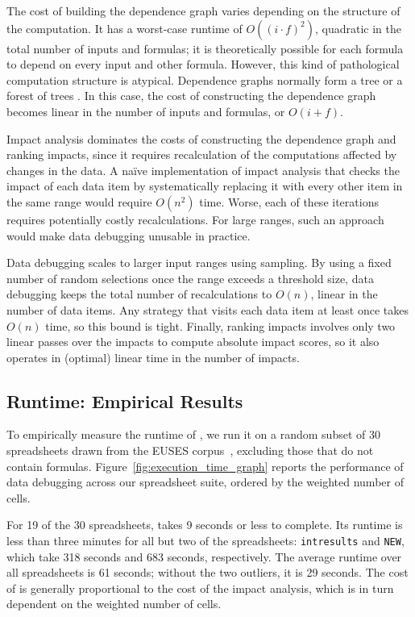 The cost of building the dependence graph varies depending on the
structure of the computation. It has a worst-case runtime of
$O((i\cdot f)^2)$, quadratic in the total number of inputs and formulas; it
is theoretically possible for each formula to depend on every input
and other formula. However, this kind of pathological computation
structure is atypical. Dependence graphs normally form a tree or a
forest of trees . In this case, the cost of constructing the dependence
graph becomes linear in the number of inputs and formulas, or
$O(i+f)$.

Impact analysis dominates the costs of constructing the dependence
graph and ranking impacts, since it requires recalculation of the
computations affected by changes in the data.
A na\"ive implementation of impact analysis that checks the impact of
each data item by systematically replacing it with every other item in
the same range would require $O(n^2)$ time. Worse, each of these
iterations requires potentially costly recalculations. For large
ranges, such an approach would make data debugging unusable in
practice.
 
Data debugging scales to larger input ranges using sampling.
By using a fixed number of random selections once the range
exceeds a threshold size, data debugging keeps the total number of
recalculations to $O(n)$, linear in the number of data items. Any
strategy that visits each data item at least once takes $O(n)$ time,
so this bound is tight.
Finally, ranking impacts involves only two linear passes over the
impacts to compute absolute impact scores, so it also operates in
(optimal) linear time in the number of impacts.

\subsection{Runtime: Empirical Results}

To empirically measure the runtime of \checkcell{}, we run it on a random
subset of 30 spreadsheets drawn from the EUSES
corpus~\cite{Fisher:2005:ESC:1082983.1083242}, excluding those that do not
contain formulas. Figure~\ref{fig:execution_time_graph} reports the
performance of data debugging across our spreadsheet suite, ordered by the
weighted number of cells.

For 19 of the 30 spreadsheets, \checkcell{} takes 9 seconds or less to
complete. Its runtime is less than three minutes for all but two of
the spreadsheets: \texttt{intresults} and \texttt{NEW}, which take 318
seconds and 683 seconds, respectively. The average runtime over all
spreadsheets is 61 seconds; without the two outliers, it is 29
seconds. The cost of \checkcell{} is generally proportional to the
cost of the impact analysis, which is in turn dependent on the
weighted number of cells. 

